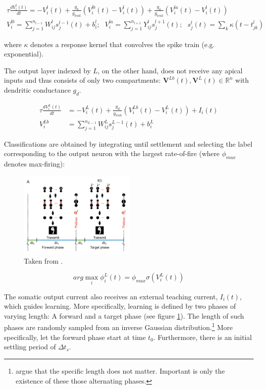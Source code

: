 \documentclass[colorinlistoftodos]{article}
\theoremstyle{definition}
\def\R{\mathbb{R}}
\begin{document}
	\begin{align*}
		\tau \frac{dV_i^l(t)}{dt} = -V_i^l(t) + \frac{g_b}{g_{leak}}\left(V_i^{lb}(t) - V_i^l(t)\right) +\frac{g_a}{g_{leak}}\left(V_i^{la}(t) - V_i^l(t)\right)\\
		V_i^{lb} = \sum_{j=1}^{n_{l-1}} W_{ij}^l s_j^{l-1}(t) + b_i^l; \ \ \ V_i^{la} = \sum_{j=1}^{n_{l+1}} Y_{ij}^l s^{l+1}_j(t); \ \ \
		s_j^{l}(t) = \sum_k \kappa(t-t_{jk}^{l})
	\end{align*}

where $\kappa$ denotes a response kernel that convolves the spike train (e.g. exponential).
	
The output layer indexed by $L$, on the other hand, does not receive any apical inputs and thus consists of only two compartments: $\mathbf{V}^{Lb}(t), \mathbf{V}^{L}(t) \in \R^n$ with dendritic conductance $g_d$. 

\begin{align*}
		\tau \frac{dV_i^L(t)}{dt} &= -V_i^L(t) + \frac{g_d}{g_{leak}}\left(V_i^{Lb}(t) - V_i^L(t) \right) + I_i(t)\\
		V_i^{Lb} &= \sum_{j=1}^{n_{L-1}} W_{ij}^L s_j^{L-1}(t) + b_i^L
\end{align*}

Classifications are obtained by integrating until settlement and selecting the label corresponding to the output neuron with the largest rate-of-fire (where $\phi_{max}$ denotes max-firing):
	
\begin{figure}
\centering
\includegraphics[width=0.5\textwidth]{../figures/report/phases}
\caption{\label{fig:phases} Taken from \citet{guerguiev2017}.}
\end{figure}

$$arg\max_i \phi^L_i(t) = \phi_{max} \sigma(V_i^L(t))$$

The somatic output current also receives an external teaching current, $I_i(t)$, which guides learning. More specifically, learning is defined by two phases of varying length: A forward and a target phase (see figure \ref{fig:phases}). The length of such phases are randomly sampled from an inverse Gaussian distribution.\footnote{\citet{guerguiev2017} argue that the specific length does not matter. Important is only the existence of these those alternating phases.}
More specifically, let the forward phase start at time $t_0$. Furthermore, there is an initial settling period of $\Delta t_s$.
 
\end{document}
